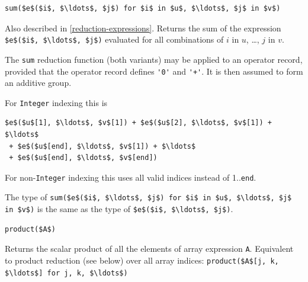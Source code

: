 \begin{operatordefinition*}[sum]\label{modelica:sum-reduction}
\begin{synopsis}\begin{lstlisting}
sum($e$($i$, $\ldots$, $j$) for $i$ in $u$, $\ldots$, $j$ in $v$)
\end{lstlisting}\end{synopsis}
\begin{semantics}
Also described in \cref{reduction-expressions}.
Returns the sum of the expression \lstinline!$e$($i$, $\ldots$, $j$)! evaluated for all combinations of $i$ in $u$, \ldots, $j$ in $v$.

The \lstinline!sum! reduction function (both variants) may be applied to an operator record, provided that the operator record defines \lstinline!'0'! and \lstinline!'+'!.
It is then assumed to form an additive group.

For \lstinline!Integer! indexing this is
\begin{lstlisting}[language=modelica]
$e$($u$[1], $\ldots$, $v$[1]) + $e$($u$[2], $\ldots$, $v$[1]) + $\ldots$
 + $e$($u$[end], $\ldots$, $v$[1]) + $\ldots$
 + $e$($u$[end], $\ldots$, $v$[end])
\end{lstlisting}
For non-\lstinline!Integer! indexing this uses all valid indices instead of 1..\lstinline!end!.

The type of \lstinline!sum($e$($i$, $\ldots$, $j$) for $i$ in $u$, $\ldots$, $j$ in $v$)! is the same as the type of \lstinline!$e$($i$, $\ldots$, $j$)!.
\end{semantics}
\end{operatordefinition*}

\begin{operatordefinition*}[product]\label{modelica:product-of-array}
\begin{synopsis}\begin{lstlisting}
product($A$)
\end{lstlisting}\end{synopsis}
\begin{semantics}
Returns the scalar product of all the elements of array expression \lstinline!A!.
Equivalent to product reduction (see below) over all array indices: \lstinline!product($A$[j, k, $\ldots$] for j, k, $\ldots$)!
\end{semantics}
\end{operatordefinition*}

